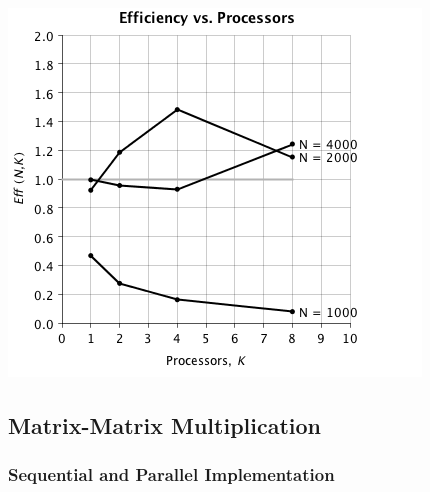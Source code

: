 \documentclass{dependencies/acm_proc_article-sp}
\begin{document}
\begin{center}
\includegraphics[scale=0.5]{images/matrix-vector/eff-vs-proc.png}
\end{center}


\subsection{Matrix-Matrix Multiplication}

\subsubsection{Sequential and Parallel Implementation}
\end{document}
